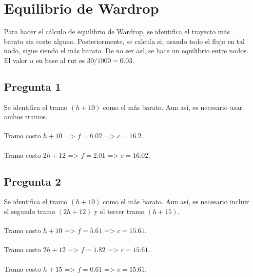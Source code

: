 \documentclass{article}  %
\begin{document}
\newpage
\thispagestyle{empty} %

\newpage
\setcounter{page}{1}
\section{Equilibrio de Wardrop}

Para hacer el cálculo de equilibrio de Wardrop, se identifica el trayecto más barato sin costo alguno. Posteriormente, se calcula si, usando todo el flujo en tal nodo, sigue siendo el más barato. De no ser así, se hace un equilibrio entre nodos. El valor \( u \) en base al rut es \( 30/1000 = 0.03 \).

\subsection{Pregunta 1}

Se identifica el tramo \( (h + 10) \) como el más barato. Aun así, es necesario usar ambos tramos.
\\ \\
Tramo costo \( h + 10 \) => \( f = 6.02 \) => \( c = 16.2 \).
\\ \\
Tramo costo \( 2h + 12 \) => \( f = 2.01 \) => \( c = 16.02 \).

\subsection{Pregunta 2}

Se identifica el tramo \( (h+10) \) como el más barato. Aun así, es necesario incluir el segundo tramo \( (2h+12) \) y el tercer tramo \( (h+15) \).
\\ \\
Tramo costo \( h + 10 \) => \( f = 5.61 \) => \( c = 15.61 \).
\\ \\
Tramo costo \( 2h + 12 \) => \( f = 1.82 \) => \( c = 15.61 \).
\\ \\
Tramo costo \( h + 15 \) => \( f = 0.61 \) => \( c = 15.61 \).
\end{document}
